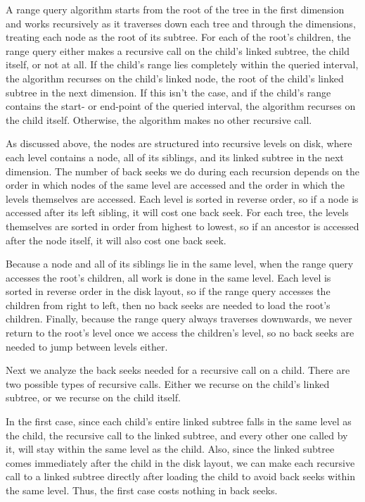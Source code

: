 \documentclass[11pt, oneside]{article}
\begin{document}
A range query algorithm starts from the root of the tree in the first dimension
and works recursively as it traverses down each tree and through the
dimensions, treating each node as the root of its subtree. For each of the
root's children, the range query either makes a recursive call on the child's
linked subtree, the child itself, or not at all. If the child's range lies
completely within the queried interval, the algorithm recurses on the child's
linked node, the root of the child's linked subtree in the next dimension. If
this isn't the case, and if the child's range contains the start- or end-point
of the queried interval, the algorithm recurses on the child itself. Otherwise,
the algorithm makes no other recursive call. 

As discussed above, the nodes are structured into recursive levels on disk,
where each level contains a node, all of its siblings, and its linked subtree
in the next dimension. The number of back seeks we do during each recursion
depends on the order in which nodes of the same level are accessed and the
order in which the levels themselves are accessed. Each level is sorted in
reverse order, so if a node is accessed after its left sibling, it will cost
one back seek. For each tree, the levels themselves are sorted in order from
highest to lowest, so if an ancestor is accessed after the node itself, it will
also cost one back seek. 

Because a node and all of its siblings lie in the same level, when the range
query accesses the root's children, all work is done in the same level.  Each
level is sorted in reverse order in the disk layout, so if the range query
accesses the children from right to left, then no back seeks are needed to load
the root's children. Finally, because the range query always traverses
downwards, we never return to the root's level once we access the children's
level, so no back seeks are needed to jump between levels either.

Next we analyze the back seeks needed for a recursive call on a child. There
are two possible types of recursive calls. Either we recurse on the child's
linked subtree, or we recurse on the child itself. 

In the first case, since each child's entire linked subtree falls in the same
level as the child, the recursive call to the linked subtree, and every other
one called by it, will stay within the same level as the child. Also, since the
linked subtree comes immediately after the child in the disk layout, we can
make each recursive call to a linked subtree directly after loading the child
to avoid back seeks within the same level. Thus, the first case costs nothing
in back seeks.
\end{document}
